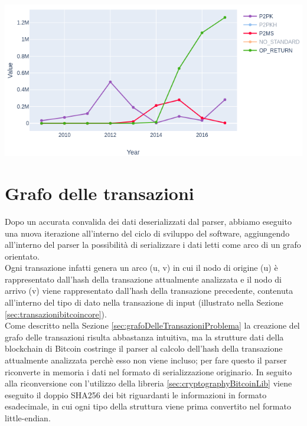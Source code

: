 {\centering
\vspace{15pt}
\includegraphics[scale=0.5]{images/OP_RETUTN_chart.png}
\vspace{10pt}
\par}


\section{Grafo delle transazioni} \label{sec:solGraphTX}

Dopo un accurata convalida dei dati deserializzati dal parser, abbiamo eseguito una nuova iterazione all'interno del ciclo di sviluppo del software, aggiungendo all'interno del parser la possibilità di serializzare i dati letti come arco di un grafo orientato.\\
Ogni transazione infatti genera un arco (u, v) in cui il nodo di origine (u) è rappresentato dall'hash della transazione attualmente analizzata e il nodo di arrivo (v) viene rappresentato dall'hash della transazione precedente, contenuta all'interno del tipo di dato  nella transazione di input (illustrato nella Sezione \ref{sec:transazionibitcoincore}).\\
Come descritto nella Sezione \ref{sec:grafoDelleTransazioniProblema} la creazione del grafo delle transazioni risulta abbastanza intuitiva, ma la strutture dati della blockchain di Bitcoin costringe il parser al calcolo dell'hash della transazione attualmente analizzata perchè esso non viene incluso; per fare questo il parser riconverte in memoria i dati nel formato di serializzazione originario.
In seguito alla riconversione con l'utilizzo della libreria \ref{sec:cryptographyBitcoinLib} viene eseguito il doppio SHA256 dei bit riguardanti le informazioni in formato esadecimale, in cui ogni tipo della struttura viene prima convertito nel formato little-endian.\\

